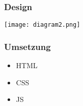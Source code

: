 \begin{frame}
	\frametitle{Design}
	\texttt{[image: diagram2.png]}
\end{frame}

\begin{frame}
	\frametitle{Umsetzung}
	\begin{itemize}
		\item[] HTML
		\item[] CSS
		\item[] JS
	\end{itemize}
\end{frame}
